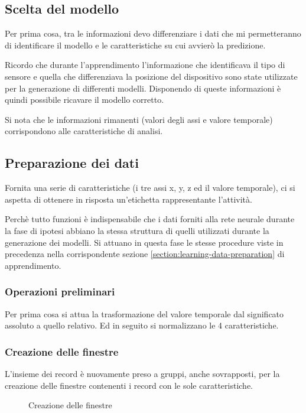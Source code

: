 \subsection{Scelta del modello}
Per prima cosa, tra le informazioni devo differenziare i dati che mi permetteranno di identificare il modello e le caratteristiche 
su cui avvierò la predizione.

Ricordo che durante l'apprendimento l'informazione che identificava il tipo di sensore e quella che differenziava 
la posizione del dispositivo sono state utilizzate per la generazione di differenti modelli.
Disponendo di queste informazioni è quindi possibile ricavare il modello corretto.

Si nota che le informazioni rimanenti (valori degli assi e valore temporale) corrispondono alle caratteristiche di analisi.


\subsection{Preparazione dei dati}
Fornita una serie di caratteristiche (i tre assi x, y, z ed il valore temporale), ci si aspetta di ottenere 
in risposta un'etichetta rappresentante l'attività.

\vspace{5mm} %

Perchè tutto funzioni è indispensabile che i dati forniti alla rete neurale durante la fase di ipotesi 
abbiano la stessa struttura di quelli utilizzati durante la generazione dei modelli.
Si attuano in questa fase le stesse procedure viste in precedenza nella corrispondente sezione 
\ref{section:learning-data-preparation} di apprendimento.

\subsubsection{Operazioni preliminari}
Per prima cosa si attua la trasformazione del valore temporale dal significato assoluto a quello relativo.
Ed in seguito si normalizzano le 4 caratteristiche.


\subsubsection{Creazione delle finestre}
L'insieme dei record è nuovamente preso a gruppi, anche sovrapposti, per la creazione delle finestre contenenti i 
record con le sole caratteristiche.

\vfill
\begin{figure}[H]
    \centering
    
    \caption{Creazione delle finestre}
    \label{fig:create_segments}
\end{figure}

